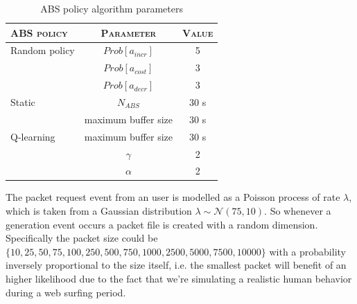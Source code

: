 \documentclass[conference,10pt]{IEEEtran}
\begin{document}
\bgroup
\def\arraystretch{1.2}%
\begin{footnotesize}
	\begin{table}[!htb]
		\centering
		\vspace{10pt}
		\caption{ABS policy algorithm parameters}\label{table:a}
		\begin{tabular}{lcc} 
			\hline
			\multicolumn{1}{l|}{\scshape ABS policy} & \multicolumn{1}{c}{\scshape Parameter}   	& \scshape Value    \\ \hline
			\multicolumn{1}{l|}{Random policy}       & \multicolumn{1}{c|}{$Prob[a_{incr}]$} 		& 5                 \\ 
			\multicolumn{1}{l|}{}                   	& \multicolumn{1}{c|}{$Prob[a_{cost}]$} 			& 3\\
			\multicolumn{1}{l|}{}                   	& \multicolumn{1}{c|}{$Prob[a_{decr}]$} 		& 3       \\ \hline
			\multicolumn{1}{l|}{Static}				& \multicolumn{1}{c|}{$N_{ABS}$} 	 			& 30 s		     \\  \hline   
			\multicolumn{1}{l|}{}					& \multicolumn{1}{c|}{maximum buffer size} 	 & 30 s		     \\           
			\multicolumn{1}{l|}{Q-learning}			& \multicolumn{1}{c|}{maximum buffer size} 	 & 30 s		     \\   
			\multicolumn{1}{l|}{}                   	& \multicolumn{1}{c|}{$\gamma$}                  & 2                 \\ 
			\multicolumn{1}{l|}{}                   	& \multicolumn{1}{c|}{$\alpha$}                  & 2                 \\              
		\end{tabular}
	\end{table}
\end{footnotesize}
\egroup
\noindent The packet request event from an user is modelled as a Poisson process of rate $\lambda$, which is taken from a Gaussian distribution $\lambda \sim \mathcal{N}(75, 10)$. So whenever a generation event occurs a packet file is created with a random dimension. Specifically the packet size could be $\lbrace 10, 25, 50, 75, 100, 250, 500, 750, 1000, 2500, 5000, 7500, 10000\rbrace$ with a probability inversely proportional to the size itself, i.e. the smallest packet will benefit of an higher likelihood due to the fact that we're simulating a realistic human behavior during a web surfing period.\\
\end{document}
